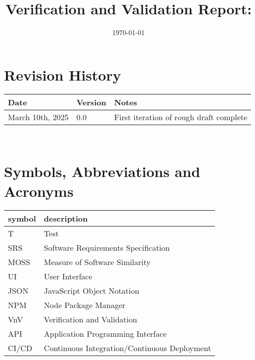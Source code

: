 \documentclass[12pt, titlepage]{article}
\begin{document}
\title{Verification and Validation Report: \progname} 
\author{\authname}
\date{\today}
	
\maketitle


\section{Revision History}

\begin{tabularx}{\textwidth}{p{3cm}p{2cm}X}
\toprule {\bf Date} & {\bf Version} & {\bf Notes}\\
\midrule
March 10th, 2025 & 0.0 & First iteration of rough draft complete\\
\bottomrule
\end{tabularx}

~\newpage

\section{Symbols, Abbreviations and Acronyms}

\renewcommand{\arraystretch}{1.2}
\begin{tabular}{l l} 
  \toprule		
  \textbf{symbol} & \textbf{description}\\
  \midrule 
  T & Test\\
  SRS & Software Requirements Specification \\
  MOSS & Measure of Software Similarity \\
  UI & User Interface \\
  JSON & JavaScript Object Notation \\
  NPM & Node Package Manager \\
  VnV & Verification and Validation \\
  API & Application Programming Interface \\
  CI/CD & Continuous Integration/Continuous Deployment\\
  \bottomrule
\end{tabular}\\

\newpage

\tableofcontents

\listoftables %

\listoffigures %
\end{document}
